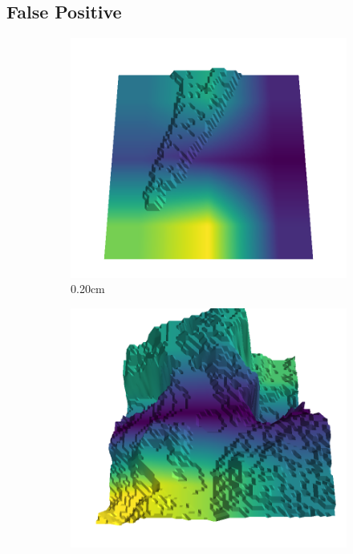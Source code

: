 \documentclass[../document.tex]{subfiles}
\begin{document}
        \subsection{False Positive}

        \begin{figure}[H]
            \centering
            \begin{subfigure}[b]{0.242\linewidth}
            \includegraphics[width=\linewidth]{../img/5/quarry/false_positive/20-patch-3d-majavi-colormap-0.png}
            \caption{0.20cm}
            \end{subfigure}
            \begin{subfigure}[b]{0.242\linewidth}
            \includegraphics[width=\linewidth]{../img/5/quarry/false_positive/21-patch-3d-majavi-colormap-5.png}

\end{subfigure}
\end{figure}
\end{document}
